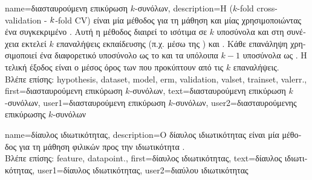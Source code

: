 {name={\foreignlanguage{greek}{διασταυρούμενη επικύρωση $k$-συνόλων}},
	description={\foreignlanguage{greek}{Η} 
		($k$-fold cross-validation - $k$-fold CV) 
		\foreignlanguage{greek}{είναι μία μέθοδος για τη μάθηση και}  
		\foreignlanguage{greek}{μίας}   
		\foreignlanguage{greek}{χρησιμοποιώντας ένα συγκεκριμένο} . 
		\foreignlanguage{greek}{Αυτή η μέθοδος 
		διαιρεί το}  \foreignlanguage{greek}{ισότιμα σε $k$ υποσύνολα 
		και στη συνέχεια εκτελεί $k$ επαναλήψεις εκπαίδευσης}  
		\foreignlanguage{greek}{(π.χ. μέσω της} ) \foreignlanguage{greek}{και} . 
		\foreignlanguage{greek}{Κάθε επανάληψη χρησιμοποιεί ένα διαφορετικό υποσύνολο ως το}  
		\foreignlanguage{greek}{και τα υπόλοιπα $k-1$ υποσύνολα ως} . 
		\foreignlanguage{greek}{Η τελική έξοδος είναι ο μέσος όρος των}  
		\foreignlanguage{greek}{που προκύπτουν από τις $k$ επαναλήψεις.\\
		Βλέπε επίσης:} \gls{hypothesis}, \gls{dataset}, \gls{model}, \gls{erm}, \gls{validation}, \gls{valset}, \gls{trainset}, \gls{valerr}.},
	first={\foreignlanguage{greek}{διασταυρούμενη επικύρωση $k$-συνόλων}},
	text={\foreignlanguage{greek}{διασταυρούμενη επικύρωση $k$-συνόλων}}, 
	user1={\foreignlanguage{greek}{διασταυρούμενη επικύρωση $k$-συνόλων}}, %
	user2={\foreignlanguage{greek}{διασταυρούμενης επικύρωσης $k$-συνόλων}} %
}

{name={\foreignlanguage{greek}{δίαυλος ιδιωτικότητας}},
 	description={\foreignlanguage{greek}{Ο δίαυλος ιδιωτικότητας} 
		\foreignlanguage{greek}{είναι μία μέθοδος 
 		για τη μάθηση φιλικών προς την ιδιωτικότητα}   \cite{PrivacyFunnel}.\\
		\foreignlanguage{greek}{Βλέπε επίσης:} \gls{feature}, \gls{datapoint}.},
 	first={\foreignlanguage{greek}{δίαυλος ιδιωτικότητας}},
 	text={\foreignlanguage{greek}{δίαυλος ιδιωτικότητας}},
 	user1={\foreignlanguage{greek}{δίαυλος ιδιωτικότητας}}, %
 	user2={\foreignlanguage{greek}{διαύλου ιδιωτικότητας}} %
}

